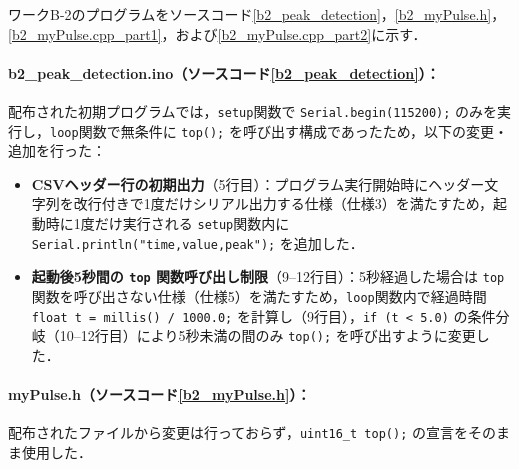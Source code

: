 ワークB-2のプログラムをソースコード\ref{b2_peak_detection}，\ref{b2_myPulse.h}，\ref{b2_myPulse.cpp_part1}，および\ref{b2_myPulse.cpp_part2}に示す．

\paragraph{b2\_peak\_detection.ino（ソースコード\ref{b2_peak_detection}）：}
配布された初期プログラムでは，\texttt{setup}関数で \texttt{Serial.begin(115200);} のみを実行し，\texttt{loop}関数で無条件に \texttt{top();} を呼び出す構成であったため，以下の変更・追加を行った：
\begin{itemize}
  \item \textbf{CSVヘッダー行の初期出力}（5行目）：プログラム実行開始時にヘッダー文字列を改行付きで1度だけシリアル出力する仕様（仕様3）を満たすため，起動時に1度だけ実行される \texttt{setup}関数内に \texttt{Serial.println("time,value,peak");} を追加した．
  \item \textbf{起動後5秒間の \texttt{top} 関数呼び出し制限}（9--12行目）：5秒経過した場合は \texttt{top} 関数を呼び出さない仕様（仕様5）を満たすため，\texttt{loop}関数内で経過時間 \texttt{float t = millis() / 1000.0;} を計算し（9行目），\texttt{if (t < 5.0)} の条件分岐（10--12行目）により5秒未満の間のみ \texttt{top();} を呼び出すように変更した．
\end{itemize}

\paragraph{myPulse.h（ソースコード\ref{b2_myPulse.h}）：}
配布されたファイルから変更は行っておらず，\texttt{uint16\_t top();} の宣言をそのまま使用した．

